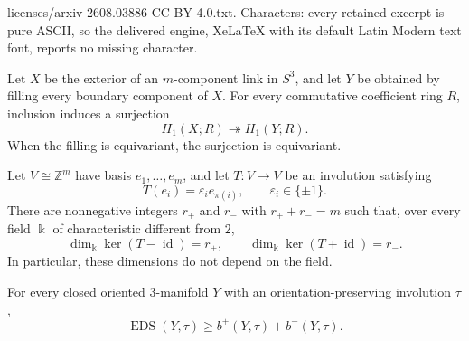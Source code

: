 \documentclass[10pt,a4paper]{amsart}
\newcommand{\EDS}{\operatorname{EDS}}
\newcommand{\Z}{\mathbb{Z}}
\newcommand{\id}{\operatorname{id}}
\begin{document}
licenses/arxiv-2608.03886-CC-BY-4.0.txt. Characters: every retained excerpt is pure ASCII, so the delivered engine, XeLaTeX with its default Latin Modern text font, reports no missing character.
\begin{lemma}\label{lem:filling}
Let $X$ be the exterior of an $m$-component link in $S^3$, and let $Y$ be obtained by filling every boundary component of $X$. For every commutative coefficient ring $R$, inclusion induces a surjection
\[
   H_1(X;R)\twoheadrightarrow H_1(Y;R).
\]
When the filling is equivariant, the surjection is equivariant.
\end{lemma}

\begin{lemma}\label{lem:signed-permutation}
Let $V\cong\Z^m$ have basis $e_1,\dots,e_m$, and let $T\colon V\to V$ be an involution satisfying
\[
   T(e_i)=\varepsilon_i e_{\pi(i)},
   \qquad
   \varepsilon_i\in\{\pm1\}.
\]
There are nonnegative integers $r_+$ and $r_-$ with $r_++r_-=m$ such that, over every field $\Bbbk$ of characteristic different from $2$,
\[
   \dim_{\Bbbk}\ker(T-\id)=r_+,
   \qquad
   \dim_{\Bbbk}\ker(T+\id)=r_-.
\]
In particular, these dimensions do not depend on the field.
\end{lemma}

\begin{proposition}\label{prop:homological-bound}
For every closed oriented $3$-manifold $Y$ with an orientation-preserving involution $\tau$,
\[
   \EDS(Y,\tau)\geq b^+(Y,\tau)+b^-(Y,\tau).
\]
\end{proposition}
\end{document}

